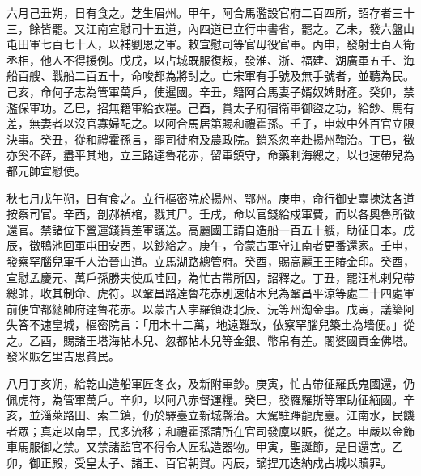 \begin{pinyinscope}
 六月己丑朔，日有食之。芝生眉州。甲午，阿合馬濫設官府二百四所，詔存者三十三，餘皆罷。又江南宣慰司十五道，內四道已立行中書省，罷之。乙未，發六盤山屯田軍七百七十人，以補劉恩之軍。敕宣慰司等官毋役官軍。丙申，發射士百人衛丞相，他人不得援例。戊戌，以占城既服復叛，發淮、浙、福建、湖廣軍五千、海船百艘、戰船二百五十，命唆都為將討之。亡宋軍有手號及無手號者，並聽為民。己亥，命何子志為管軍萬戶，使暹國。辛丑，籍阿合馬妻子婿奴婢財產。癸卯，禁濫保軍功。乙巳，招無籍軍給衣糧。己酉，賞太子府宿衛軍御盜之功，給鈔、馬有差，無妻者以沒官寡婦配之。以阿合馬居第賜和禮霍孫。壬子，申敕中外百官立限決事。癸丑，從和禮霍孫言，罷司徒府及農政院。鎖系忽辛赴揚州鞫治。丁巳，徵亦奚不薛，盡平其地，立三路達魯花赤，留軍鎮守，命藥剌海總之，以也速帶兒為都元帥宣慰使。



 秋七月戊午朔，日有食之。立行樞密院於揚州、鄂州。庚申，命行御史臺揀汰各道按察司官。辛酉，剖郝禎棺，戮其尸。壬戌，命以官錢給戍軍費，而以各奧魯所徵還官。禁諸位下營運錢貨差軍護送。高麗國王請自造船一百五十艘，助征日本。戊辰，徵鴨池回軍屯田安西，以鈔給之。庚午，令蒙古軍守江南者更番還家。壬申，發察罕腦兒軍千人治晉山道。立馬湖路總管府。癸酉，賜高麗王王睶金印。癸酉，宣慰孟慶元、萬戶孫勝夫使瓜哇回，為忙古帶所囚，詔釋之。丁丑，罷汪札剌兒帶總帥，收其制命、虎符。以鞏昌路達魯花赤別速帖木兒為鞏昌平涼等處二十四處軍前便宜都總帥府達魯花赤。以蒙古人孛羅領湖北辰、沅等州淘金事。戊寅，議築阿失答不速皇城，樞密院言：「用木十二萬，地遠難致，依察罕腦兒築土為墻便。」從之。乙酉，賜諸王塔海帖木兒、忽都帖木兒等金銀、幣帛有差。闍婆國貢金佛塔。發米賑乞里吉思貧民。



 八月丁亥朔，給乾山造船軍匠冬衣，及新附軍鈔。庚寅，忙古帶征羅氏鬼國還，仍佩虎符，為管軍萬戶。辛卯，以阿八赤督運糧。癸巳，發羅羅斯等軍助征緬國。辛亥，並淄萊路田、索二鎮，仍於驛臺立新城縣治。大駕駐蹕龍虎臺。江南水，民饑者眾；真定以南旱，民多流移；和禮霍孫請所在官司發廩以賑，從之。申嚴以金飾車馬服御之禁。又禁諸監官不得令人匠私造器物。甲寅，聖誕節，是日還宮。乙卯，御正殿，受皇太子、諸王、百官朝賀。丙辰，謫捏兀迭納戍占城以贖罪。




\end{pinyinscope}
